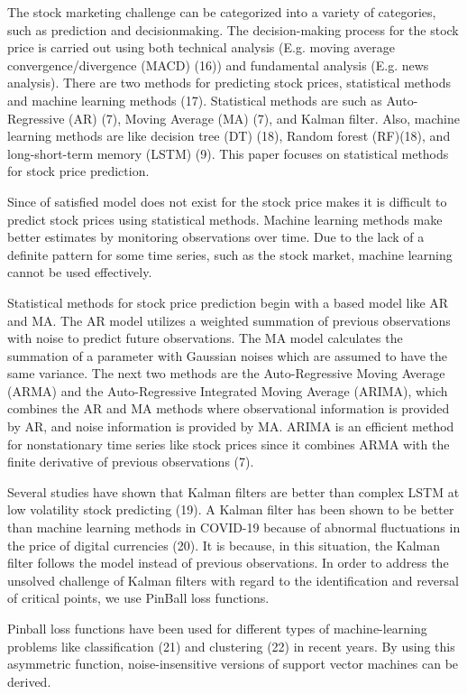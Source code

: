 \documentclass[12pt,a4paper]{article}
\begin{document}
	The stock marketing challenge can be categorized into a variety of categories, such as prediction and decisionmaking. The decision-making process for the stock price is carried out using both technical analysis (E.g. moving average convergence/divergence (MACD) (16)) and fundamental analysis (E.g. news analysis). There are two methods for predicting stock prices, statistical methods and machine learning methods (17). Statistical methods are such as Auto-Regressive (AR) (7), Moving Average (MA) (7), and Kalman filter. Also, machine learning methods are like decision tree (DT) (18), Random forest (RF)(18), and long-short-term memory (LSTM) (9). This paper focuses on statistical methods for stock price prediction.
	
	Since of satisfied model does not exist for the stock price makes it is difficult to predict stock prices using statistical methods. Machine learning methods make better estimates by monitoring observations over time. Due to the lack of a definite pattern for some time series, such as the stock market, machine learning cannot be used effectively.
	
	Statistical methods for stock price prediction begin with a based model like AR and MA. The AR model utilizes a weighted summation of previous observations with noise to predict future observations. The MA model calculates the summation of a parameter with Gaussian noises which are assumed to have the same variance. The next two methods are the Auto-Regressive Moving Average (ARMA) and the Auto-Regressive Integrated Moving Average (ARIMA), which combines the AR and MA methods where observational information is provided by AR, and noise information is provided by MA. ARIMA is an efficient method for nonstationary time series like stock prices since it combines ARMA with the finite derivative of previous observations (7).
	
	Several studies have shown that Kalman filters are better than complex LSTM at low volatility stock predicting (19). A Kalman filter has been shown to be better than machine learning methods in COVID-19 because of abnormal fluctuations in the price of digital currencies (20). It is because, in this situation, the Kalman filter follows the model instead of previous observations. In order to address the unsolved challenge of Kalman filters with regard to the identification and reversal of critical points, we use PinBall loss functions.
	
	Pinball loss functions have been used for different types of machine-learning problems like classification (21) and clustering (22) in recent years. By using this asymmetric function, noise-insensitive versions of support vector machines can be derived.
	
\end{document}
